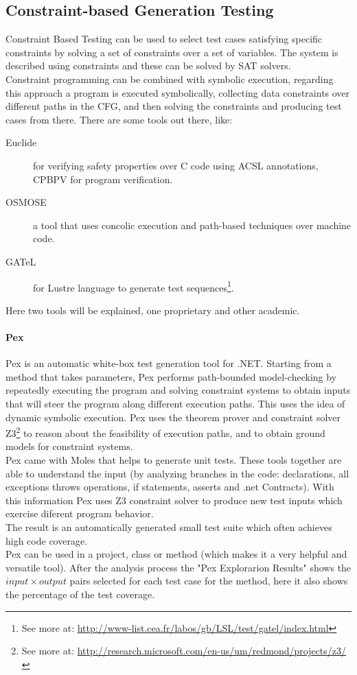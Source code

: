 \subsection{Constraint-based Generation Testing}
Constraint Based Testing\cite{DeMillo91constraint-basedautomatic} can be used to select test cases satisfying specific constraints by
solving a set of constraints over a set of variables. The system is described using constraints and these can be solved by \ac{SAT} solvers.\\
Constraint programming can be combined with symbolic execution, regarding this approach a program is executed symbolically,
collecting data constraints over different paths in the \ac{CFG}, and then solving the constraints and producing test cases from there.
There are some tools out there, like:

\begin{description}
\item[Euclide] for verifying safety properties over C code using \ac{ACSL} annotations, CPBPV for program verification.
\item[OSMOSE] a tool that uses concolic execution and path-based techniques over machine code.
\item[GATeL] for Lustre language to generate test sequences\footnote{See more at: \url{http://www-list.cea.fr/labos/gb/LSL/test/gatel/index.html}}.
\end{description}

Here two tools will be explained, one proprietary and other academic.

\paragraph{Pex} Pex\cite{Tillmann:2008:PWB:1792786.1792798} is an automatic white-box test generation tool for .NET. Starting from a
method that takes parameters, Pex performs path-bounded model-checking
by repeatedly executing the program and solving constraint systems to obtain inputs that will steer the program along different execution paths.
This uses the idea of dynamic symbolic execution\cite{Tillmann06unittests}. Pex uses the theorem prover and
constraint solver Z3\footnote{See more at: \url{http://research.microsoft.com/en-us/um/redmond/projects/z3/}} to reason about the feasibility of execution paths, and
to obtain ground models for constraint systems.\\
Pex came with Moles that helps to generate unit tests. These tools together are able to understand the input (by analyzing branches in the code:
declarations, all exceptions throws operations, if statements, asserts and .net Contracts). With this information Pex uses Z3 constraint solver to
produce new test inputs which exercise diferent program behavior.\\
The result is an automatically generated small test suite which often achieves high code coverage.\\
Pex can be used in a project, class or method (which makes it a very helpful and versatile tool). After the analysis process the "Pex Explorarion Results" shows
the $input \times output$ pairs selected for each test case for the method, here it also shows the percentage of the test coverage.

